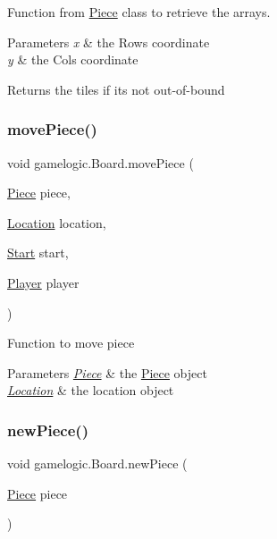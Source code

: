 Function from \mbox{\hyperlink{classgamelogic_1_1_piece}{Piece}} class to retrieve the arrays. 
\begin{DoxyParams}{Parameters}
{\em x} & the Row\textquotesingle{}s coordinate \\
\hline
{\em y} & the Col\textquotesingle{}s coordinate \\
\hline
\end{DoxyParams}
\begin{DoxyReturn}{Returns}
the tiles if it\textquotesingle{}s not out-\/of-\/bound 
\end{DoxyReturn}
\mbox{\label{classgamelogic_1_1_board_ab7bfac3d534d441e6ebbd1adef05659b}} 
\subsubsection{\texorpdfstring{move\+Piece()}{movePiece()}}
{\footnotesize\ttfamily void gamelogic.\+Board.\+move\+Piece (\begin{DoxyParamCaption}\item[{\mbox{\hyperlink{classgamelogic_1_1_piece}{Piece}}}]{piece,  }\item[{\mbox{\hyperlink{classgamelogic_1_1_location}{Location}}}]{location,  }\item[{\mbox{\hyperlink{classgamelogic_1_1_start}{Start}}}]{start,  }\item[{\mbox{\hyperlink{classgamelogic_1_1_player}{Player}}}]{player }\end{DoxyParamCaption})}

Function to move piece 
\begin{DoxyParams}{Parameters}
{\em \mbox{\hyperlink{classgamelogic_1_1_piece}{Piece}}} & the \mbox{\hyperlink{classgamelogic_1_1_piece}{Piece}} object \\
\hline
{\em \mbox{\hyperlink{classgamelogic_1_1_location}{Location}}} & the location object \\
\hline
\end{DoxyParams}
\mbox{\label{classgamelogic_1_1_board_a8173f158887a169056c7b1e39cc1885d}} 
\subsubsection{\texorpdfstring{new\+Piece()}{newPiece()}}
{\footnotesize\ttfamily void gamelogic.\+Board.\+new\+Piece (\begin{DoxyParamCaption}\item[{\mbox{\hyperlink{classgamelogic_1_1_piece}{Piece}}}]{piece }\end{DoxyParamCaption})}

